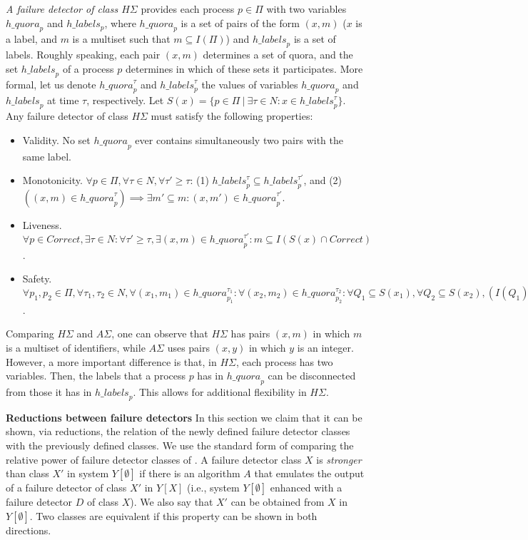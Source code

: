 \documentclass[10pt, conference, compsocconf]{IEEEtran}
\newcommand{\tightparagraph}[1]{\smallskip \noindent \textbf{#1} \hspace{1ex}}
\newcommand{\HS}{{H\Sigma}}
\newcommand{\AS}{{A\Sigma}}
\newcommand{\C}{{\mathit{Correct}}}
\newcommand{\quora}{{\mathit{h\_quora}}}
\newcommand{\labels}{{\mathit{h\_labels}}}
\begin{document}
\emph{A failure detector of class $\HS$} 
provides each process $p \in \Pi$ 
with two variables $\quora_p$ and $\labels_p$, where $\quora_p$ is a set 
of pairs of the form $(x,m)$ ($x$ is a label, and $m$ is a multiset such 
that $m \subseteq I(\Pi)$) and $\labels_p$ is a set of labels. 
Roughly speaking, each pair $(x,m)$ determines a set of quora, and the set 
$\labels_p$ of a process $p$ determines in which of these sets it 
participates. More formal,
let us denote $\quora_p^{\tau}$ and  $\labels_p^{\tau}$ the values of 
variables $\quora_p$ and $\labels_p$ at time $\tau$, respectively.
Let $S(x)=\{p \in \Pi \ |\ \exists \tau \in N : x \in \labels_p^\tau\}$.
Any failure detector of class $\HS$ must satisfy the following properties: 
\begin{itemize}
\item
Validity.  No set $\quora_p$ ever contains simultaneously two pairs 
with the same label.
\item
Monotonicity.
$ \forall p \in \Pi , \forall \tau \in N, \forall \tau' \ge \tau$: 
(1) $\labels_p^{\tau} \subseteq \labels_p^{\tau'}$, and 
(2) $((x,m) \in \quora_p^\tau) \implies  
\exists m' \subseteq m : (x,m') \in \quora_p^{\tau'} $.
\item
Liveness. $\forall p \in \C , \exists \tau \in N: \forall \tau' \ge \tau , 
\exists (x,m) \in \quora_p^{\tau'} : m \subseteq I(S(x) \cap  \C)$.
\item
Safety. $\forall p_1, p_2 \in \Pi , \forall \tau_1, \tau_2 \in N,  
\forall (x_1,m_1) \in \quora_{p_1}^{\tau_1} : 
\forall (x_2,m_2) \in \quora_{p_2}^{\tau_2}:
 \forall Q_1 \subseteq S(x_1), \forall Q_2 \subseteq S(x_2), 
(I(Q_1) = m_1 \wedge I(Q_2) = m_2) \implies (Q_1 \cap Q_2 \not= \emptyset)$.
\end{itemize}
Comparing $\HS$ and $\AS$, one can observe that $\HS$ has pairs $(x,m)$ 
in which $m$ is a multiset of identifiers, while $\AS$ uses pairs $(x,y)$ 
in which $y$ is an integer. However,
a more important difference is that, in $\HS$, each process has two variables.
 Then, the labels that a process $p$ has in $\quora_p$ can be disconnected 
from those it has in
$\labels_p$. This allows for additional flexibility in $\HS$.


\tightparagraph{Reductions between failure detectors}
\label{red-FD}
In this section we claim that it can be shown, via reductions, 
the relation of the newly defined failure detector classes with 
the previously defined classes.
We use the standard form of comparing the relative power of failure 
detector classes of \cite{DBLP:journals/jacm/ChandraT96}.
A failure detector class $X$ is \emph{stronger} than class $X'$ in 
system $Y[\emptyset]$ if there is an algorithm $A$ that emulates the 
output of a failure detector of class $X'$ in $Y[X]$ 
(i.e., system $Y[\emptyset]$ enhanced with a failure detector $D$ 
of class $X$). We also say that $X'$ can be obtained from $X$ 
in $Y[\emptyset]$. Two classes are equivalent if this property 
can be shown in both directions.
\end{document}
